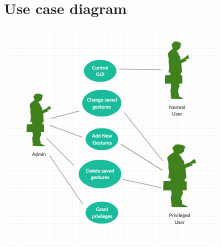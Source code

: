 \documentclass{scrreprt}
\begin{document}
\section{Use case diagram}
\begin{center}
    \includegraphics{usecase.png}
\end{center}
\end{document}

